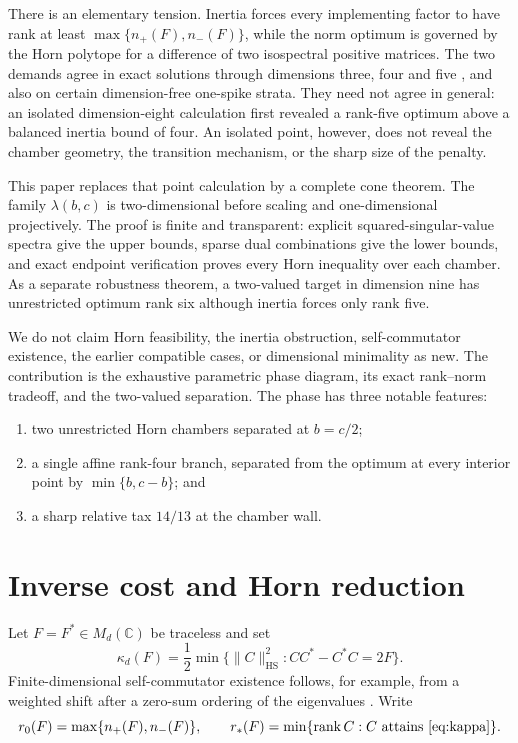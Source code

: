 \documentclass[11pt]{article}
\newcommand{\HS}{\mathrm{HS}}
\newcommand{\rank}{\operatorname{rank}}
\begin{document}
There is an elementary tension.  Inertia forces every implementing factor to
have rank at least $\max\{n_+(F),n_-(F)\}$, while the norm optimum is governed
by the Horn polytope for a difference of two isospectral positive matrices.
The two demands agree in exact solutions through dimensions three, four and
five \cite{erikssonQutrit,erikssonFour,erikssonFive}, and also on certain
dimension-free one-spike strata.  They need not agree in general: an isolated
dimension-eight calculation first revealed a rank-five optimum above a
balanced inertia bound of four.  An isolated point, however, does not reveal
the chamber geometry, the transition mechanism, or the sharp size of the
penalty.

This paper replaces that point calculation by a complete cone theorem.  The
family $\lambda(b,c)$ is two-dimensional before scaling and one-dimensional
projectively.  The proof is finite and transparent: explicit
squared-singular-value spectra give the upper bounds, sparse dual combinations
give the lower bounds, and exact endpoint verification proves every Horn
inequality over each chamber.  As a separate robustness theorem, a two-valued
target in dimension nine has unrestricted optimum rank six although inertia
forces only rank five.

We do not claim Horn feasibility, the inertia obstruction, self-commutator
existence, the earlier compatible cases, or dimensional minimality as new.
The contribution is the exhaustive parametric phase diagram, its exact
rank--norm tradeoff, and the two-valued separation.  The phase has three
notable features:
\begin{enumerate}[leftmargin=2em]
 \item two unrestricted Horn chambers separated at $b=c/2$;
 \item a single affine rank-four branch, separated from the optimum at every
 interior point by $\min\{b,c-b\}$; and
 \item a sharp relative tax $14/13$ at the chamber wall.
\end{enumerate}

\section{Inverse cost and Horn reduction}

Let $F=F^*\in M_d(\mathbb C)$ be traceless and set
\begin{equation}
 \kappa_d(F)=\frac12\min\{\|C\|_{\HS}^2:CC^*-C^*C=2F\}.
 \label{eq:kappa}
\end{equation}
Finite-dimensional self-commutator existence follows, for example, from a
weighted shift after a zero-sum ordering of the eigenvalues
\cite{fan1980,beltita2014}.  Write
\[
 r_0(F)=\max\{n_+(F),n_-(F)\},\qquad
 r_*(F)=\min\{\rank C:C\text{ attains \eqref{eq:kappa}}\}.
\]
\end{document}
